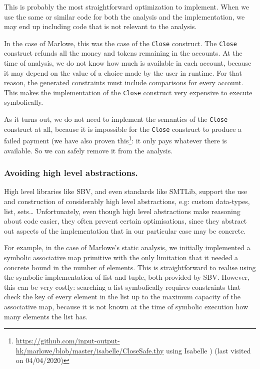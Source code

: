 \documentclass[english,runningheads]{llncs}
\begin{document}
This is probably the most straightforward optimization to implement.
When we use the same or similar code for both the analysis and the
implementation, we may end up including code that is not relevant
to the analysis.

In the case of Marlowe, this was the case of the \texttt{Close} construct.
The \texttt{Close} construct refunds all the money and tokens remaining
in the accounts. At the time of analysis, we do not know how much
is available in each account, because it may depend on the value of
a choice made by the user in runtime. For that reason, the generated
constraints must include comparisons for every account. This makes
the implementation of the \texttt{Close} construct very expensive
to execute symbolically.

As it turns out, we do not need to implement the semantics of the
\texttt{Close} construct at all, because it is impossible for the
\texttt{Close} construct to produce a failed payment
(we have also proven this\footnote{\url{https://github.com/input-output-hk/marlowe/blob/master/isabelle/CloseSafe.thy} using Isabelle \cite{nipkow2002isabelle})
(last visited on 04/04/2020)}: it only pays whatever there is available.
So we can safely remove it from the analysis.

\subsubsection{Avoiding high level abstractions.}

High level libraries like SBV, and even standards like SMTLib, support
the use and construction of considerably high level abstractions,
e.g: custom data-types, list, sets\dots{} Unfortunately, even though
high level abstractions make reasoning about code easier, they often
prevent certain optimisations, since they abstract out aspects of
the implementation that in our particular case may be concrete.

For example, in the case of Marlowe's static analysis, we initially
implemented a symbolic associative map primitive with the only limitation
that it needed a concrete bound in the number of elements. This is
straightforward to realise using the symbolic implementation of list
and tuple, both provided by SBV. However, this can be very costly:
searching a list symbolically requires constraints that check
the key of every element in the list up to the maximum capacity of
the associative map, because it is not known at the time of symbolic
execution how many elements the list has.
\end{document}
